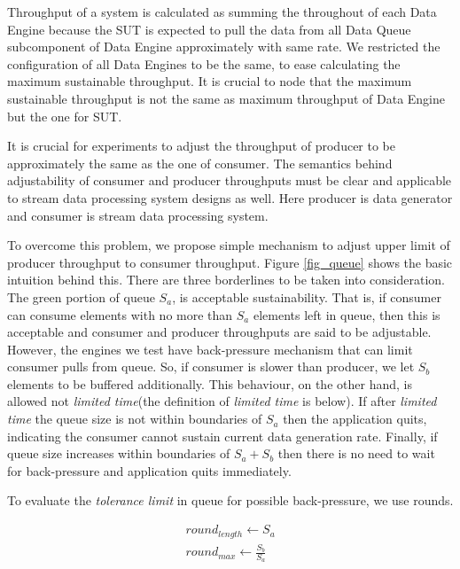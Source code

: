 \documentclass{vldb}
\begin{document}
Throughput of a system is calculated as summing the throughout of each Data Engine  because the SUT is expected to pull the data from all Data Queue subcomponent of Data Engine approximately with same rate. We restricted the configuration of all Data Engines to be the same, to ease calculating the maximum sustainable throughput. It is crucial to node that the maximum sustainable throughput is not the same as maximum throughput of Data Engine but the one for SUT. 

It is crucial for experiments to adjust the throughput of producer to be approximately the same as the one of consumer. The semantics behind adjustability of consumer and producer throughputs must be clear and applicable to stream data processing system designs as well. Here producer is data generator and consumer is stream data processing system. 

To overcome this problem, we propose simple mechanism to adjust upper limit of producer throughput  to consumer throughput. Figure \ref{fig_queue} shows the basic intuition behind this. There are three borderlines to be taken into consideration. The green portion of queue $S_{a}$,  is acceptable sustainability. That is, if consumer can consume elements with no more than $S_{a}$ elements left in queue, then this is acceptable and consumer and producer throughputs are said to be adjustable. However, the engines we test have back-pressure mechanism that can limit consumer pulls from queue. So, if consumer is slower than producer, we let $S_{b}$ elements to be buffered additionally. This behaviour, on the other hand, is allowed not \textit{limited time}(the definition of \textit{limited time} is below). If after \textit{limited time} the queue size is not within boundaries of $S_{a}$ then the application quits, indicating the consumer cannot sustain current data generation rate. Finally, if queue size increases within boundaries of $S_{a} + S_{b}$ then there is no need to wait for back-pressure and application quits immediately. 

To evaluate the \textit{tolerance limit} in queue for possible back-pressure, we use rounds. 

\begin{equation}
  \begin{gathered}
round_{length} \gets S_{a} \\
round_{max} \gets \frac{S_{b}}{S_{a}}
 \end{gathered}\label{eq_3}
\end{equation}
\end{document}
